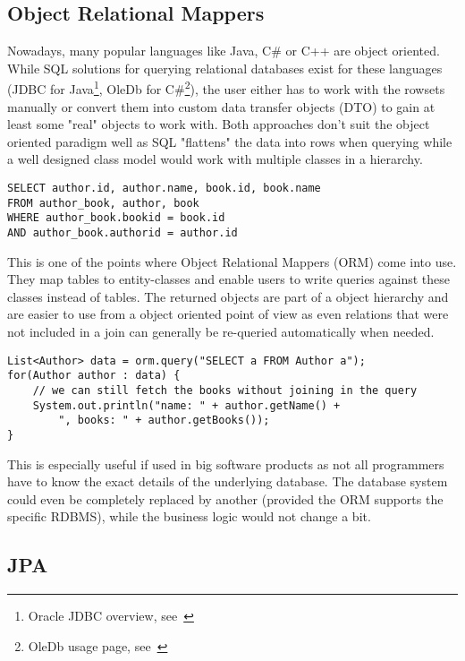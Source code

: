\subsection{Object Relational Mappers}
Nowadays, many popular languages like Java, C\# or C++ are object oriented. While SQL solutions for querying relational databases exist for these languages (JDBC for Java\footnote{Oracle JDBC overview, see~\cite{jdbc_oracle}}, OleDb for C\#\footnote{OleDb usage page, see~\cite{oledb_ms}}), the user either has to work with the rowsets manually or convert them into custom data transfer objects (DTO) to gain at least some "real" objects to work with. Both approaches don't suit the object oriented paradigm well as SQL "flattens" the data into rows when querying while a well designed class model would work with multiple classes in a hierarchy.
\\
\lstset{language=sql}
\begin{lstlisting}[frame=htrbl, caption={SQL "flattening" the author and book table into rows}, label={lst:flattening.sql}]
SELECT author.id, author.name, book.id, book.name 
FROM author_book, author, book
WHERE author_book.bookid = book.id
AND author_book.authorid = author.id
\end{lstlisting}
This is one of the points where Object Relational Mappers (ORM) come into use. They map tables to entity-classes and
enable users to write queries against these classes instead of tables. The returned objects are part of a object hierarchy and are easier to use from a object oriented point of view as even relations that were not included in a join can generally be re-queried automatically when needed.
\\
\lstset{language=java}
\begin{lstlisting}[frame=htrbl, caption={ORM query example}, label={lst:flattening.sql}]
List<Author> data = orm.query("SELECT a FROM Author a");
for(Author author : data) {
	// we can still fetch the books without joining in the query
	System.out.println("name: " + author.getName() + 
		", books: " + author.getBooks());
}
\end{lstlisting}
\noindent
This is especially useful if used in big software products as not all programmers have to know the exact details of the underlying database. The database system could even be completely replaced by another (provided the ORM supports the specific RDBMS), while the business logic would not change a bit.

\subsection{JPA}

